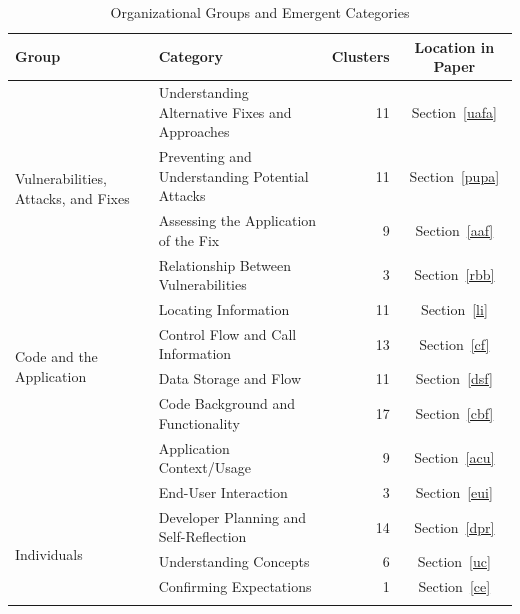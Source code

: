 \documentclass{acm_proc_article-sp}
\begin{document}
\begin{table} 
\centering
\caption{Organizational Groups and Emergent Categories}
\begin{tabularx}{\textwidth}{|l|X|r|c|}
\rowcolor{gray!50}
\hline
    Group											& Category										& Clusters		& Location in Paper	  	\\
    \hline			
    \multirow{4}{*}{Vulnerabilities, Attacks, and Fixes}
        											& Understanding Alternative Fixes and Approaches	& 11     		& Section~\ref{uafa}	\\

    												& Preventing and Understanding Potential Attacks	& 11     		& Section~\ref{pupa}		\\

    												& Assessing the Application of the Fix				& 9     		& Section~\ref{aaf}				\\

    												& Relationship Between Vulnerabilities							& 3     		& Section~\ref{rbb}			\\
    \hline
    \multirow{4}{*}{Code and the Application}	
    												& Locating Information 								& 11      		& Section~\ref{li}		\\

    												& Control Flow and Call Information					& 13     		& Section~\ref{cf}	\\

    												& Data Storage and Flow								& 11     		& Section~\ref{dsf}  	\\

    												& Code Background and Functionality	 				& 17     		& Section~\ref{cbf}			\\

    									& Application Context/Usage										& 9     		& Section~\ref{acu}			\\

    									& End-User Interaction											& 3     		& Section~\ref{eui}		\\
    \hline	
    \multirow{4}{*}{Individuals}	
    									& Developer Planning and Self-Reflection						& 14    		& Section~\ref{dpr}		\\

    									& Understanding Concepts										& 6 			& Section~\ref{uc}			\\

    									& Confirming Expectations					 					& 1				& Section~\ref{ce}  \\
    \hline
	\multirow{4}{*}{Problem Solving Support}


\end{tabularx}
\end{table}
\end{document}
